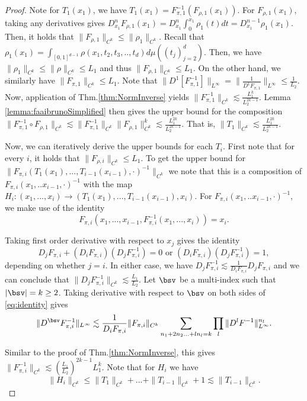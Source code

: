 \begin{proof}
Note for $T_1(x_1)$, we have $T_1(x_1) = F_{\pi, 1}^{-1}(F_{\rho, 1}(x_1))$. For $F_{\rho, 1}(x_1)$, taking any derivatives gives $D^n_{x_1} F_{\rho, 1}(x_1) = D^n_{x_1}\int_{0}^{x_1}\rho_1(t)dt = D^{n-1}_{x_1}\rho_1(x_1)$. Then, it holds that $\|F_{\rho, 1}\|_{C^k} \leq \|\rho_1\|_{C^k}.$ Recall that $\rho_1(x_1) = \int_{[0,1]^{d-1}}\rho(x_1,t_2,t_3,..,t_d)d\mu((t_j)_{j=2}^d)$. Then, we have $\|\rho_1\|_{C^k} \leq \|\rho\|_{C^k}\leq L_1$ and thus $\|F_{\rho, 1}\|_{C^k} \leq L_1$. On the other hand, we similarly have $\|F_{\pi, 1}\|_{C^k} \leq L_1$. Note that $\|D^1[F_{\pi,1}^{-1}]\|_{L^\infty} = \|\frac{1}{D^1F_{\pi,1}}\|_{L^\infty} \leq \frac{1}{L_2}$. Now, application of Thm.\ref{thm:NormInverse} yields $\|F_{\pi,1}^{-1}\|_{C^k} \lesssim \frac{L_1^k}{L_2^{2k-1}}$. Lemma \ref{lemma:faaibrunoSimplified} then gives the upper bound for the composition $\|F_{\pi,1}^{-1}\circ F_{\rho,1}\|_{C^k} \lesssim \|F_{\pi,1}^{-1}\|_{C^k}\|F_{\rho,1}\|_{C^k}^k \lesssim \frac{L_1^{2k}}{L_2^{2k-1}}$. That is, $\|T_1\|_{C^k} \lesssim \frac{L_1^{2k}}{L_2^{2k-1}}$.

Now, we can iteratively derive the upper bounds for each $T_i$. First note that for every $i$, it holds that $\|F_{\rho, i}\|_{C^k} \leq L_1$. To get the upper bound for $\|F_{\pi,i}(T_1(x_1),...,T_{i-1}(x_{i-1}), \cdot)^{-1}\|_{C^k}$ we note that this is a composition of $F_{\pi,i}(x_1,..x_{i-1}, \cdot)^{-1}$ with the map $H_i: (x_1,...,x_i) \rightarrow (T_1(x_1),...,T_{i-1}(x_{i-1}), x_i)$. For $F_{\pi,i}(x_1,..x_{i-1}, \cdot)^{-1}$, we make use of the identity 
\begin{equation}\label{eq:identity}
F_{\pi,i}(x_1,...,x_{i-1}, F_{\pi, i}^{-1}(x_1,...,x_i)) = x_i.     
\end{equation}


Taking first order derivative with respect to $x_j$ gives the identity 
$$D_jF_{\pi,i} + (D_iF_{\pi,i})(D_jF^{-1}_{\pi,i}) = 0 \text{ or } (D_iF_{\pi,i})(D_jF^{-1}_{\pi,i}) = 1,$$
depending on whether $j = i$. In either case, we have $D_jF^{-1}_{\pi,i} \lesssim \frac{1}{D_iF_{\pi,i}}D_jF_{\pi,i}$ and we can conclude that $\|D_jF^{-1}_{\pi,i}\|_{C^k} \lesssim \frac{L_1}{L_2}$. Let $\bsv$ be a multi-index such that $|\bsv| = k \geq 2$. Taking derivative with respect to $\bsv$ on both sides of \ref{eq:identity} gives
$$\|D^\bsv F_{\pi, i}^{-1}\|_{L^\infty} \lesssim \frac{1}{D_iF_{\pi, i}}\|F_{\pi, i}\|_{C^k}\sum_{n_1+ 2n_2...+ ln_l = k} \prod_{l}\|D^lF^{-1}\|^{n_l}_{L^\infty}.$$

Similar to the proof of Thm.\ref{thm:NormInverse}, this gives $\|F^{-1}_{\pi,i}\|_{C^k} \lesssim (\frac{L_1}{L_2})^{2k-1}L_1^k$. Note that for $H_i$ we have
$$\|H_i\|_{C^k} \leq \|T_1\|_{C^k} + ... + \|T_{i-1}\|_{C^k} + 1\lesssim \|T_{i-1}\|_{C^k}.$$


\end{proof}
